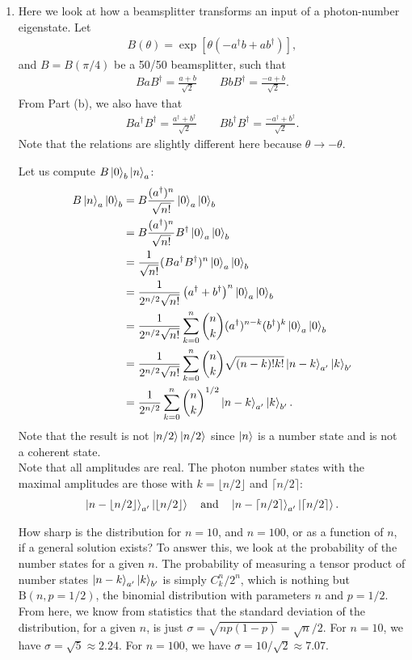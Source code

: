 \documentclass{article}
\theoremstyle{definition}
\newcommand{\f}[2]{\frac{#1}{#2}}
\newcommand{\lp}{\left(}
\newcommand{\rp}{\right)}
\newcommand{\lb}{\left[}
\newcommand{\rb}{\right]}
\begin{document}
\begin{enumerate}[label=\alph*)]
\item Here we look at how a beamsplitter transforms an input of a photon-number eigenstate. Let 
\begin{align*}
B(\theta) = \exp\lb \theta \lp -a^\dagger b + ab^\dagger  \rp\rb,
\end{align*}
and $B = B(\pi/4)$ be a 50/50 beamsplitter, such that
\begin{align*}
BaB^\dagger = \f{a+b}{\sqrt{2}} \quad\quad  BbB^\dagger = \f{-a + b}{\sqrt{2}}.
\end{align*}
From Part (b), we also have that
\begin{align*}
Ba^\dagger B^\dagger = \f{a^\dagger + b^\dagger}{\sqrt{2}} \quad\quad Bb^\dagger B^\dagger = \f{-a^\dagger + b^\dagger}{\sqrt{2}}.
\end{align*}
Note that the relations are slightly different here because $\theta \to -\theta$.

Let us compute $B\ket{0}_b\ket{n}_a$:
\begin{align*}
B\ket{n}_a \ket{0}_b 
&= B \f{(a^\dagger)^n}{\sqrt{n!}} \ket{0}_{a}\ket{0}_{b} \\
&= B \f{(a^\dagger)^n}{\sqrt{n!}} B^\dagger \ket{0}_{a}\ket{0}_{b} \\
&= \f{1}{\sqrt{n!}} (B a^\dagger B^\dagger)^n \ket{0}_a \ket{0}_b \\
&= \f{1}{2^{n/2} \sqrt{n!} } \lp a^\dagger + b^\dagger \rp^n \ket{0}_a \ket{0}_b \\
&= \f{1}{2^{n/2} \sqrt{n!}} \sum_{k=0}^n  {n\choose{k }} (a^\dagger)^{n-k} (b^\dagger)^{k} \ket{0}_a \ket{0}_b \\
&= \f{1}{2^{n/2} \sqrt{n!}} \sum_{k=0}^n {n\choose{k }}  \sqrt{(n-k)! k! }  \ket{n-k}_{a'} \ket{k}_{b'} \\
&= \f{1}{2^{n/2}} \sum_{k=0}^n  {n \choose{k}}^{1/2} \ket{n-k}_{a'} \ket{k}_{b'}.
\end{align*}
Note that the result is not $\ket{n/2}\ket{n/2}$ since $\ket{n}$ is a number state and is not a coherent state. \\

Note that all amplitudes are real. The photon number states with the maximal amplitudes are those with $k = \lfloor{n/2} \rfloor$ and $\lceil{n/2} \rceil$: 
\begin{align*}
\ket{n - \lfloor{n/2}\rfloor}_{a'} \ket{\lfloor{n/2}\rfloor } 
\quad \text{and} \quad 
\ket{n - \lceil{n/2}\rceil}_{a'} \ket{\lceil{n/2}\rceil }.
\end{align*}

How sharp is the distribution for $n = 10$, and $n = 100$, or as a function of $n$, if a general solution exists? To answer this, we look at the probability of the number states for a given $n$. The probability of measuring a tensor product of number states $\ket{n-k}_{a'}\ket{k}_{b'}$ is simply $C^{n}_k/2^{n}$, which is nothing but $\text{B}(n,p=1/2)$, the binomial distribution with parameters $n$ and $p=1/2$. From here, we know from statistics that the standard deviation of the distribution, for a given $n$, is just $\sigma = \sqrt{np(1-p)} = \sqrt{n}/2$.  For $n=10$, we have $\sigma = \sqrt{5} \approx 2.24$. For $n=100$, we have $\sigma = 10/\sqrt{2} \approx 7.07$. 


\end{enumerate}
\end{document}
